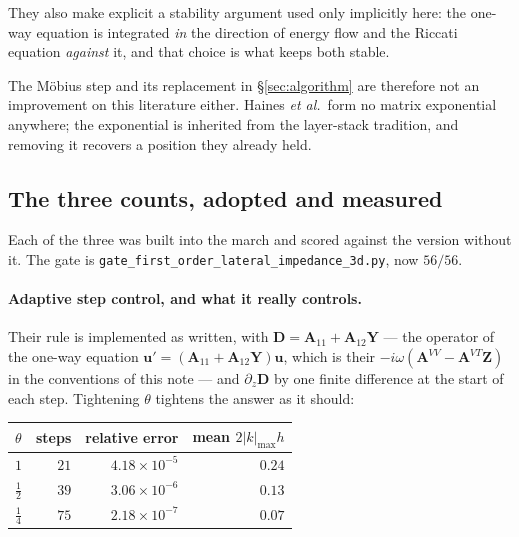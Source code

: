 \documentclass[11pt,a4paper]{article}
\newcommand{\bA}{\mathbf{A}}
\newcommand{\bu}{\mathbf{u}}
\newcommand{\bY}{\mathbf{Y}}
\begin{document}
They also make explicit a stability argument used only implicitly here: the
one-way equation is integrated \emph{in} the direction of energy flow and the
Riccati equation \emph{against} it, and that choice is what keeps both stable.

The M\"obius step and its replacement in \S\ref{sec:algorithm} are therefore not
an improvement on this literature either.  Haines \emph{et al.}\ form no matrix
exponential anywhere; the exponential is inherited from the layer-stack
tradition, and removing it recovers a position they already held.

\subsection{The three counts, adopted and measured}\label{sec:tricks}

Each of the three was built into the march and scored against the version
without it.  The gate is \verb|gate_first_order_lateral_impedance_3d.py|, now
$56/56$.

\paragraph{Adaptive step control, and what it really controls.}  Their rule is
implemented as written, with $\mathbf{D}=\bA_{11}+\bA_{12}\bY$ --- the operator
of the one-way equation $\bu'=(\bA_{11}+\bA_{12}\bY)\bu$, which is their
$-i\omega(\bA^{VV}-\bA^{VT}\mathbf{Z})$ in the conventions of this note --- and
$\partial_z\mathbf{D}$ by one finite difference at the start of each step.
Tightening $\theta$ tightens the answer as it should:

\begin{center}
\begin{tabular}{@{}lrrr@{}}
\toprule
$\theta$ & steps & relative error & mean $2|k|_{\max}h$\\
\midrule
$1$            & $21$ & $4.18\times10^{-5}$ & $0.24$\\
$\tfrac12$     & $39$ & $3.06\times10^{-6}$ & $0.13$\\
$\tfrac14$     & $75$ & $2.18\times10^{-7}$ & $0.07$\\
\bottomrule
\end{tabular}
\end{center}
\end{document}

